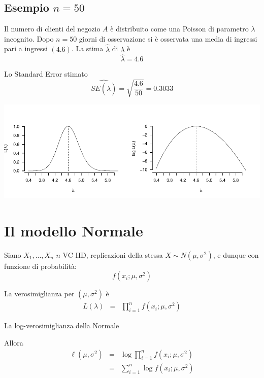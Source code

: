 \documentclass[
  11pt,
]{book}
\theoremstyle{mytheoremstyle}
\theoremstyle{mydefstyle}
\begin{document}
\subsection{\texorpdfstring{Esempio \(n=50\)}{Esempio n=50}}\label{esempio-n50}

Il numero di clienti del negozio \(A\) è distribuito come una Poisson di parametro \(\lambda\) incognito. Dopo \(n=50\) giorni di osservazione si è osservata una media di ingressi pari a ingressi \((4.6)\).
La stima \(\hat\lambda\) di \(\lambda\) è
\[\hat\lambda=4.6\]

Lo Standard Error stimato
\[\widehat{SE(\hat\lambda)}=\sqrt{\frac {4.6} {50}}=0.3033\]

\begin{center}\includegraphics{Appunti_di_Statistica_2025_files/figure-latex/12-Verosimiglianza-22-1} \end{center}

\section{Il modello Normale}\label{il-modello-normale}

Siano \(X_1,...,X_n\) \(n\) VC IID, replicazioni della stessa \(X\sim N(\mu,\sigma^2)\), e dunque con funzione di probabilità:
\[f(x_i;\mu,\sigma^2)\]

\begin{info}
La verosimiglianza per \((\mu,\sigma^2)\) è
\begin{eqnarray*}
  L(\lambda) &=& \prod_{i=1}^n f(x_i;\mu,\sigma^2)
\end{eqnarray*}

\end{info}

La log-verosimiglianza della Normale

Allora
\begin{eqnarray*}
          \ell(\mu,\sigma^2)   &=& \log \prod_{i=1}^n f(x_i;\mu,\sigma^2)\\
                               &=& \sum_{i=1}^n \log  f(x_i;\mu,\sigma^2)
\end{eqnarray*}
\end{document}

